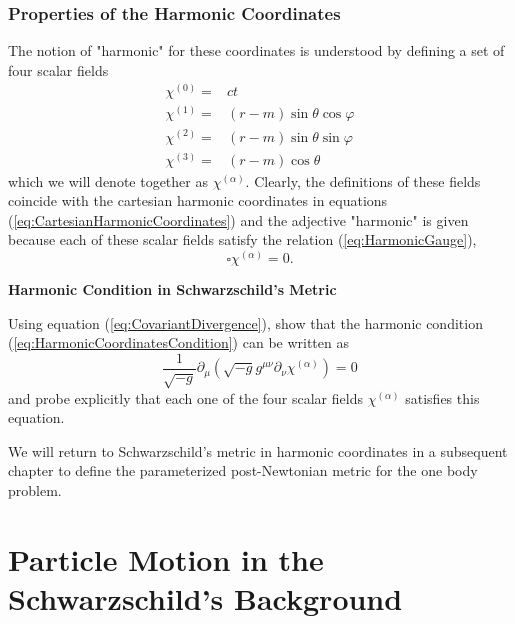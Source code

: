 \subsubsection{Properties of the Harmonic Coordinates}

The notion of "harmonic" for these coordinates is understood by defining a set of four scalar fields 
\begin{subequations}
\begin{align}
\chi ^{(0)} = &ct \\
\chi ^{(1)} = & (r-m) \sin \theta \cos \varphi\\
\chi ^{(2)} = & (r-m) \sin \theta \sin \varphi \\
\chi ^{(3)} = & (r-m) \cos \theta
\end{align}
\end{subequations}
which we will denote together as $\chi ^{(\alpha )}$. Clearly, the definitions of these fields coincide with the cartesian harmonic coordinates in equations (\ref{eq:CartesianHarmonicCoordinates}) and the adjective "harmonic" is given because each of these scalar fields satisfy the relation (\ref{eq:HarmonicGauge}),
\begin{equation}
\square \chi ^{(\alpha)}  = 0. \label{eq:HarmonicCoordinatesCondition}
\end{equation}

\begin{exercise}
\textbf{Harmonic Condition in Schwarzschild's Metric}

Using equation (\ref{eq:CovariantDivergence}), show that the harmonic condition (\ref{eq:HarmonicCoordinatesCondition}) can be written as
\begin{equation}
\frac{1}{\sqrt{-g}} \partial _\mu \left( \sqrt{-g} g^{\mu \nu} \partial_\nu \chi^{(\alpha)} \right) = 0
\end{equation}
and probe explicitly that each one of the four scalar fields $\chi ^{(\alpha)} $ satisfies this equation.
\end{exercise}

We will return to Schwarzschild's metric in harmonic coordinates in a subsequent chapter to define the parameterized post-Newtonian metric for the one body problem.

\section{Particle Motion in the Schwarzschild's Background} \label{sec:ParticleMotionSchwarzschild}

